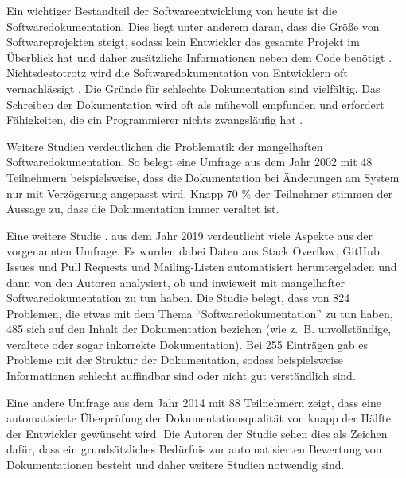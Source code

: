 \label{sec:introduction}

Ein wichtiger Bestandteil der Softwareentwicklung von heute ist die Softwaredokumentation. Dies liegt unter anderem daran, dass die Größe von Softwareprojekten steigt, sodass kein Entwickler das gesamte Projekt im Überblick hat und daher zusätzliche Informationen neben dem Code benötigt \cite[S. 1]{StaticAnalysis:AnIntroduction:TheFundamentalChallengeofSoftwareEngineeringisOneofComplexity.}. Nichtsdestotrotz wird die Softwaredokumentation von Entwicklern oft vernachlässigt \cite[S. 83]{Qualityanalysisofsourcecodecomments}.  Die Gründe für schlechte Dokumentation sind vielfältig. Das Schreiben der Dokumentation wird oft als mühevoll empfunden und erfordert Fähigkeiten, die ein Programmierer nichts zwangsläufig hat \cite[S. 70]{AutomaticQualityAssessmentofSourceCodeComments:TheJavadocMiner} \cite[S. 593]{Softwareengineeringandsoftwaredocumentation:aunifiedlongcourse}.  

Weitere Studien verdeutlichen die Problematik der mangelhaften Softwaredokumentation. So belegt eine Umfrage aus dem Jahr 2002 mit 48 Teilnehmern  beispielsweise, dass die Dokumentation  bei Änderungen am System  nur mit Verzögerung angepasst wird. Knapp 70 \% der Teilnehmer stimmen der Aussage zu, dass die Dokumentation immer veraltet ist.   \cite[S. 28-29]{TheRelevanceofSoftwareDocumentationToolsandTechnologies:ASurvey}

Eine weitere Studie  \cite[S.1199-1208]{SoftwareDocumentationIssuesUnveiled}. aus dem Jahr 2019 verdeutlicht viele Aspekte aus der vorgenannten Umfrage. Es wurden dabei Daten aus Stack Overflow, GitHub Issues und Pull Requests und Mailing-Listen automatisiert heruntergeladen und dann von den Autoren analysiert, ob und inwieweit mit mangelhafter Softwaredokumentation zu tun haben.  Die Studie belegt, dass von 824 Problemen, die etwas mit dem Thema \enquote{Softwaredokumentation} zu tun haben, 485 sich auf den Inhalt der Dokumentation beziehen (wie z.~B. unvollständige, veraltete oder sogar inkorrekte Dokumentation). Bei 255 Einträgen gab es Probleme mit der Struktur der Dokumentation, sodass beispielsweise Informationen schlecht auffindbar sind oder nicht gut verständlich sind.


Eine andere Umfrage aus dem Jahr 2014 mit 88 Teilnehmern zeigt, dass eine automatisierte Überprüfung der Dokumentationsqualität von knapp der Hälfte der Entwickler gewünscht wird. Die Autoren der Studie sehen dies als Zeichen dafür, dass ein grundsätzliches Bedürfnis zur automatisierten Bewertung von Dokumentationen besteht und daher weitere Studien notwendig sind. \cite[S. 340]{TheValueofSoftwareDocumentationQuality}

